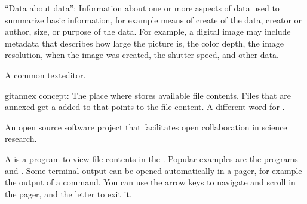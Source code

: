 \begin{description}
\sphinxAtStartPar
“Data about data”: Information about one or more aspects of data used to summarize
basic information, for example means of create of the data, creator or author, size,
or purpose of the data. For example, a digital image may include metadata that
describes how large the picture is, the color depth, the image resolution, when the image
was created, the shutter speed, and other data.

\ignorespaces 
\sphinxAtStartPar
A common text\sphinxhyphen{}editor.

\ignorespaces 
\sphinxAtStartPar
git\sphinxhyphen{}annex concept: The place where {\hyperref[\detokenize{glossary:term-git-annex}]{}} stores available file contents. Files that are annexed get
a {\hyperref[\detokenize{glossary:term-symlink}]{}} added to {\hyperref[\detokenize{glossary:term-Git}]{}} that points to the file content. A different word for {\hyperref[\detokenize{glossary:term-annex}]{}}.

\sphinxAtStartPar
An open source software project that facilitates open collaboration in science research.

\ignorespaces 
\sphinxAtStartPar
A  is a program to view file contents in the {\hyperref[\detokenize{glossary:term-terminal}]{}}. Popular examples are the programs  and . Some terminal output can be opened automatically in a pager, for example the output of a  command. You can use the arrow keys to navigate and scroll in the pager, and the letter  to exit it.


\end{description}
